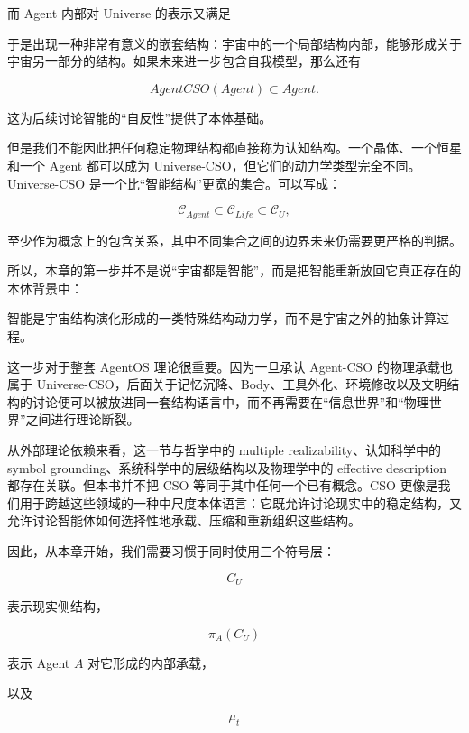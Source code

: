 而 Agent 内部对 Universe 的表示又满足

\begin{statementbox}
\centering
{}
\end{statementbox}

于是出现一种非常有意义的嵌套结构：宇宙中的一个局部结构内部，能够形成关于宇宙另一部分的结构。如果未来进一步包含自我模型，那么还有

\[
AgentCSO(Agent)
\subset Agent.
\]

这为后续讨论智能的“自反性”提供了本体基础。

但是我们不能因此把任何稳定物理结构都直接称为认知结构。一个晶体、一个恒星和一个 Agent 都可以成为 Universe-CSO，但它们的动力学类型完全不同。Universe-CSO 是一个比“智能结构”更宽的集合。可以写成：

\[
\mathcal{C}_{Agent}
\subset
\mathcal{C}_{Life}
\subset
\mathcal{C}_{U},
\]

至少作为概念上的包含关系，其中不同集合之间的边界未来仍需要更严格的判据。

所以，本章的第一步并不是说“宇宙都是智能”，而是把智能重新放回它真正存在的本体背景中：

\begin{statementbox}
智能是宇宙结构演化形成的一类特殊结构动力学，而不是宇宙之外的抽象计算过程。
\end{statementbox}

这一步对于整套 AgentOS 理论很重要。因为一旦承认 Agent-CSO 的物理承载也属于 Universe-CSO，后面关于记忆沉降、Body、工具外化、环境修改以及文明结构的讨论便可以被放进同一套结构语言中，而不再需要在“信息世界”和“物理世界”之间进行理论断裂。

从外部理论依赖来看，这一节与哲学中的 multiple realizability、认知科学中的 symbol grounding、系统科学中的层级结构以及物理学中的 effective description 都存在关联。但本书并不把 CSO 等同于其中任何一个已有概念。CSO 更像是我们用于跨越这些领域的一种中尺度本体语言：它既允许讨论现实中的稳定结构，又允许讨论智能体如何选择性地承载、压缩和重新组织这些结构。

因此，从本章开始，我们需要习惯于同时使用三个符号层：

\[
\boxed{
C_U
}
\]

表示现实侧结构，

\[
\boxed{
\pi_A(C_U)
}
\]

表示 Agent $A$ 对它形成的内部承载，

以及

\[
\boxed{
\mu_t
}
\]

